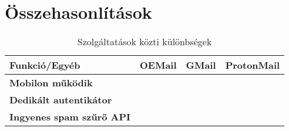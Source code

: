 ﻿\chapter{Összehasonlítások}


\newcommand{\contains}{\textcolor{green!70}{\faCheckCircle}}
\newcommand{\notContains}{\textcolor{red!70}{\faTimesCircle}}

\begin{table}[!ht]
    \centering
    \begin{tabularx}{\linewidth}{|>{\bfseries\centering}m{2.5cm}|m{3cm}|m{3cm}|X|}
    \hline
        \textbf{Funkció/Egyéb} & \textbf{OEMail} & \textbf{GMail} & \textbf{ProtonMail} \\
    \hline
        Mobilon működik & \contains & \contains & \contains \\ \hline
        Dedikált autentikátor & \contains & \contains & \notContains \\ \hline
        Ingyenes spam szűrő API & \contains & \notContains & \notContains \\ \hline
    \end{tabularx}
    \caption{Szolgáltatások közti különbségek}
    \label{szolg}
\end{table}